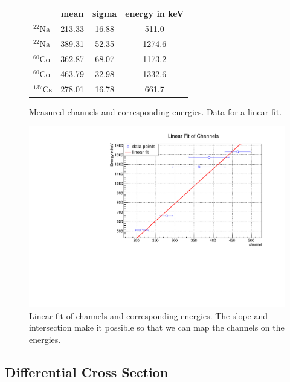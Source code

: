 \begin{figure}[h]
\centering
\caption{Measured channels and corresponding energies. Data for a linear fit.}
\vspace{0.2cm}
\begin{tabular}{lccc}
& mean & sigma & energy in keV \\
\hline
\hline
\vspace{0.1cm}
${}^{22}\mathrm{Na}$ & 213.33 & 16.88 & 511.0 \\
${}^{22}\mathrm{Na}$ & 389.31 & 52.35 & 1274.6 \\
$^{60}\mathrm{Co}$ & 362.87 & 68.07 & 1173.2 \\
$^{60}\mathrm{Co}$ & 463.79 & 32.98 & 1332.6 \\
$^{137}\mathrm{Cs}$ & 278.01 & 16.78 & 661.7 \\
\end{tabular}
\end{figure}

\begin{figure}[h]
\centering
\includegraphics[scale=0.5]{./../plots/calibration/lin_fit.pdf}
\caption{Linear fit of channels and corresponding energies. The slope and intersection make it possible so that we can map the channels on the energies.}
\end{figure}


\newpage

\subsection{Differential Cross Section}

